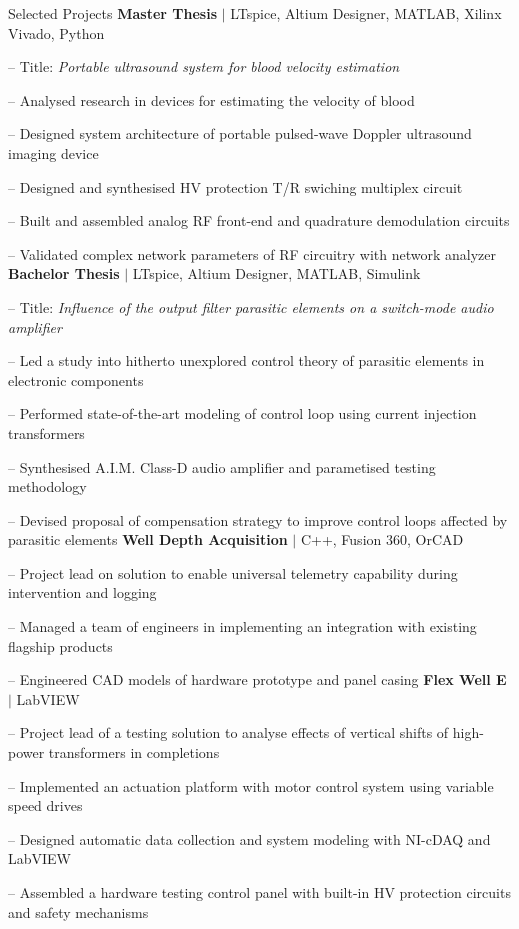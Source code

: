 
\begin{rubric}{\faTasks[solid]  Selected Projects}
\entry*[2023][]%
	\textbf{Master Thesis} $|$ LTspice, Altium Designer, MATLAB, Xilinx Vivado, Python \par
	-- Title: \emph{Portable ultrasound system for blood velocity estimation} \par
	-- Analysed research in devices for estimating the velocity of blood \par
	-- Designed system architecture of portable pulsed-wave Doppler ultrasound imaging device \par
	-- Designed and synthesised HV protection T/R swiching multiplex circuit \par
	-- Built and assembled analog RF front-end and quadrature demodulation circuits \par
	-- Validated complex network parameters of RF circuitry with network analyzer
%
\entry*[2020][] \textbf{Bachelor Thesis} $|$ LTspice, Altium Designer, MATLAB, Simulink \par
	-- Title: \emph{Influence of the output filter parasitic elements on a switch-mode audio amplifier} \par
	-- Led a study into hitherto unexplored control theory of parasitic elements in electronic components \par
	-- Performed state-of-the-art modeling of control loop using current injection transformers \par
	-- Synthesised A.I.M. Class-D audio amplifier and parametised testing methodology \par
	-- Devised proposal of compensation strategy to improve control loops affected by parasitic elements
%
\entry*[2017][] \textbf{Well Depth Acquisition} $|$ C++, Fusion 360, OrCAD \par
	-- Project lead on solution to enable universal telemetry capability during intervention and logging \par
	-- Managed a team of engineers in implementing an integration with existing flagship products \par
	-- Engineered CAD models of hardware prototype and panel casing %
%
\entry*[2016][] \textbf{Flex Well E} $|$ LabVIEW \par
	-- Project lead of a testing solution to analyse effects of vertical shifts of high-power transformers in completions \par
	-- Implemented an actuation platform with motor control system using variable speed drives \par
	-- Designed automatic data collection and system modeling with NI-cDAQ and LabVIEW \par
	-- Assembled a hardware testing control panel with built-in HV protection circuits and safety mechanisms
\end{rubric}